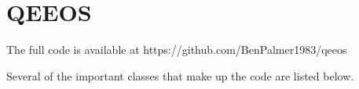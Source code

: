 \chapter{QEEOS}
\label{chapter:qeeosappendix}
 
The full code is available at https://github.com/BenPalmer1983/qeeos

Several of the important classes that make up the code are listed below.














